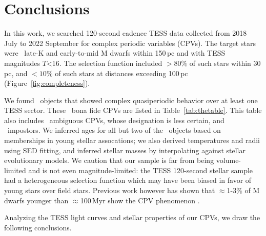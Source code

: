 \documentclass[11pt,twocolumn,tighten]{aastex63}
\begin{document}
\section{Conclusions}
\label{sec:conclusion}

In this work, we searched 120-second cadence TESS data collected from
2018 July to 2022 September for complex periodic variables (CPVs).  The target
stars were \nstarssearched\ late-K and early-to-mid M dwarfs within 150\,pc
and with TESS magnitudes $T$<16. 
The selection function included $>$$80\%$ of such stars within 30\,pc, and $<$$10\%$ of such stars at distances exceeding 100\,pc (Figure~\ref{fig:completeness}).

We found \ngoods\ objects that showed complex
quasiperiodic behavior over at least one TESS sector.  These \ngoods\
bona fide CPVs are listed in Table~\ref{tab:thetable}.  This table also
includes \nmaybes\ ambiguous CPVs, whose designation is
less certain, and \ndebunked\ impostors.  We inferred ages for all but
two of the \nallcands\ objects based on memberships in young stellar assocations; we
also derived temperatures and radii using SED fitting, and 
inferred stellar masses by interpolating against stellar evolutionary
models.  We caution that our sample is far from being
volume-limited and is not even magnitude-limited:
the TESS 120-second stellar sample had a heterogeneous
selection function which may have been biased in favor of young stars
over field stars.  Previous work however has shown that $\approx$1-3\%
of M dwarfs younger than $\approx$100\,Myr show the CPV phenomenon
\citep{2016AJ....152..114R,2022AJ....163..144G,2022AJ....164...80R}.

Analyzing the TESS light curves and stellar properties of our CPVs, we
draw the following conclusions.
\end{document}
